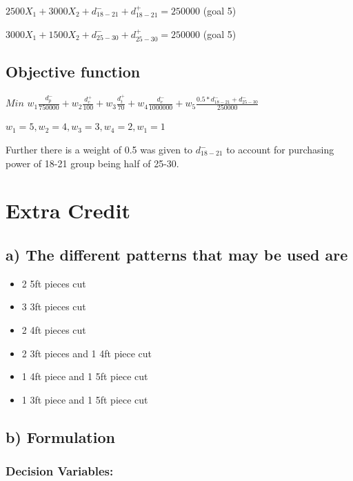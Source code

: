 \documentclass[]{article}
\providecommand{\tightlist}{%
  \setlength{\itemsep}{0pt}\setlength{\parskip}{0pt}}
\begin{document}
\(2500X_{1} + 3000X_{2} + d_{18-21}^{-} + d_{18-21}^{+} = 250000\) (goal
5)

\(3000X_{1} + 1500X_{2} + d_{25-30}^{-} + d_{25-30}^{+} = 250000\) (goal
5)

\subsection{Objective function}\label{objective-function-3}

\(Min\)
\(w_{1} \frac{d_{p}^{-}}{750000} + w_{2} \frac{d_{c}^{+}}{100} + w_{3}\frac{d_{t}^{+}}{70} + w_{4}\frac{d_{e}^{-}}{1000000} + w_{5}\frac{0.5*d_{18-21}^{-} + d_{25-30}^{-}}{250000}\)

\(w_{1} = 5, w_{2} = 4, w_{3} = 3, w_{4} = 2, w_{1} = 1\)

Further there is a weight of 0.5 was given to \(d_{18-21}^{-}\) to
account for purchasing power of 18-21 group being half of 25-30.

\section{Extra Credit}\label{extra-credit}

\subsection{a) The different patterns that may be used
are}\label{a-the-different-patterns-that-may-be-used-are}

\begin{itemize}
\tightlist
\item
  2 5ft pieces cut
\item
  3 3ft pieces cut
\item
  2 4ft pieces cut
\item
  2 3ft pieces and 1 4ft piece cut
\item
  1 4ft piece and 1 5ft piece cut
\item
  1 3ft piece and 1 5ft piece cut
\end{itemize}

\subsection{b) Formulation}\label{b-formulation}

\subsubsection{Decision Variables:}\label{decision-variables-4}
\end{document}
